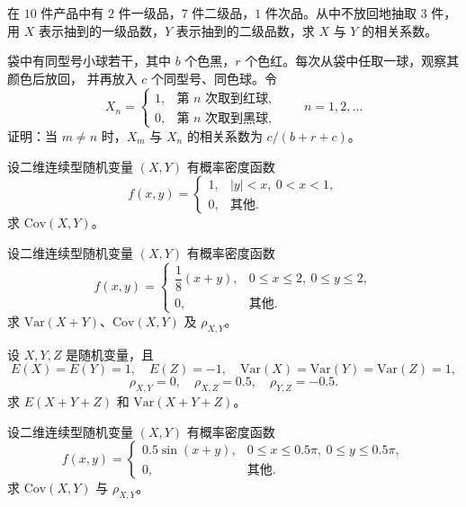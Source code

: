 \begin{homework}[3.28]
在 $10$ 件产品中有 $2$ 件一级品，$7$ 件二级品，$1$ 件次品。从中不放回地抽取 $3$ 件，
用 $X$ 表示抽到的一级品数，$Y$ 表示抽到的二级品数，求 $X$ 与 $Y$ 的相关系数。
\end{homework}

\begin{homework}[3.29]
袋中有同型号小球若干，其中 $b$ 个色黑，$r$ 个色红。每次从袋中任取一球，观察其颜色后放回，
并再放入 $c$ 个同型号、同色球。令
\[
X_n=
\begin{cases}
1, & \text{第 } n \text{ 次取到红球},\\
0, & \text{第 } n \text{ 次取到黑球},
\end{cases}
\qquad n=1,2,\ldots
\]
证明：当 $m\ne n$ 时，$X_m$ 与 $X_n$ 的相关系数为 $c/(b+r+c)$。
\end{homework}

\begin{homework}[3.30]
设二维连续型随机变量 $(X,Y)$ 有概率密度函数
\[
f(x,y)=
\begin{cases}
1, & |y|<x,\ 0<x<1,\\[4pt]
0, & \text{其他}.
\end{cases}
\]
求 $\mathrm{Cov}(X,Y)$。
\end{homework}

\begin{homework}[3.31]
设二维连续型随机变量 $(X,Y)$ 有概率密度函数
\[
f(x,y)=
\begin{cases}
\dfrac{1}{8}(x+y), & 0\le x\le2,\ 0\le y\le2,\\[4pt]
0, & \text{其他}.
\end{cases}
\]
求 $\mathrm{Var}(X+Y)$、$\mathrm{Cov}(X,Y)$ 及 $\rho_{X,Y}$。
\end{homework}

\begin{homework}[3.32]
设 $X,Y,Z$ 是随机变量，且
\[
E(X)=E(Y)=1,\quad E(Z)=-1,\quad 
\mathrm{Var}(X)=\mathrm{Var}(Y)=\mathrm{Var}(Z)=1,
\]
\[
\rho_{X,Y}=0,\quad \rho_{X,Z}=0.5,\quad \rho_{Y,Z}=-0.5.
\]
求 $E(X+Y+Z)$ 和 $\mathrm{Var}(X+Y+Z)$。
\end{homework}

\begin{homework}[3.33]
设二维连续型随机变量 $(X,Y)$ 有概率密度函数
\[
f(x,y)=
\begin{cases}
0.5\sin(x+y), & 0\le x\le0.5\pi,\ 0\le y\le0.5\pi,\\[4pt]
0, & \text{其他}.
\end{cases}
\]
求 $\mathrm{Cov}(X,Y)$ 与 $\rho_{X,Y}$。
\end{homework}

